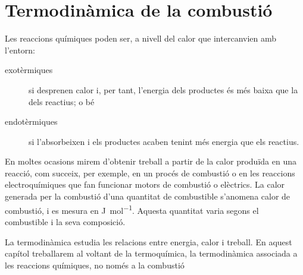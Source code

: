 \section{Termodinàmica de la combustió}

Les reaccions químiques poden ser, a nivell del calor que intercanvien amb l'entorn:
\begin{description}
\item[exotèrmiques] si desprenen calor i, per tant, l'energia dels productes és més baixa que la dels reactius; o bé
\item[endotèrmiques] si l'absorbeixen i els productes acaben tenint més energia que els reactius.
\end{description}

En moltes ocasions mirem d'obtenir treball a partir de la calor produïda en una reacció, com succeix, per exemple, en un procés de combustió o en les reaccions electroquímiques que fan funcionar motors de combustió o elèctrics. La calor generada per la combustió d'una quantitat de combustible s'anomena calor de combustió, i es mesura en \si{\joule\per\mole}. Aquesta quantitat varia segons el combustible i la seva composició.

La termodinàmica estudia les relacions entre energia, calor i treball.
En aquest capítol treballarem al voltant de la termoquímica, la termodinàmica associada a les reaccions químiques, no només a la combustió

